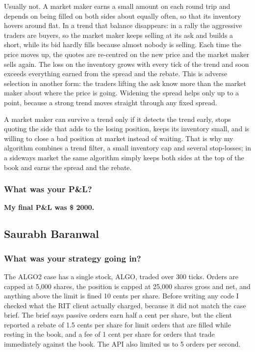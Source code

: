\documentclass{article}
\begin{document}
Usually not. A market maker earns a small amount on each round trip and depends on being filled on both
sides about equally often, so that its inventory hovers around flat. In a trend that balance
disappears: in a rally the aggressive traders are buyers, so the market maker keeps selling at its ask
and builds a short, while its bid hardly fills because almost nobody is selling. Each time the price
moves up, the quotes are re-centred on the new price and the market maker sells again. The loss on the
inventory grows with every tick of the trend and soon exceeds everything earned from the spread and the
rebate. This is adverse selection in another form: the traders lifting the ask know more than the market
maker about where the price is going. Widening the spread helps only up to a point, because a strong
trend moves straight through any fixed spread.

A market maker can survive a trend only if it detects the trend early, stops quoting the side that adds
to the losing position, keeps its inventory small, and is willing to close a bad position at market
instead of waiting. That is why my algorithm combines a trend filter, a small inventory cap and several
stop-losses; in a sideways market the same algorithm simply keeps both sides at the top of the book and
earns the spread and the rebate.

\subsubsection{What was your P\&L?}

\textbf{My final P\&L was \$ 2000. }



\subsection{Saurabh Baranwal}

\subsubsection{What was your strategy going in?}

The ALGO2 case has a single stock, ALGO, traded over 300 ticks. Orders are capped at 5{,}000 shares, the position is capped at 25{,}000 shares gross and net, and anything above the limit is fined 10 cents per share. Before writing any code I checked what the RIT client actually charged, because it did not match the case brief. The brief says passive orders earn half a cent per share, but the client reported a rebate of 1.5 cents per share for limit orders that are filled while resting in the book, and a fee of 1 cent per share for orders that trade immediately against the book. The API also limited us to 5 orders per second.\\
\end{document}
